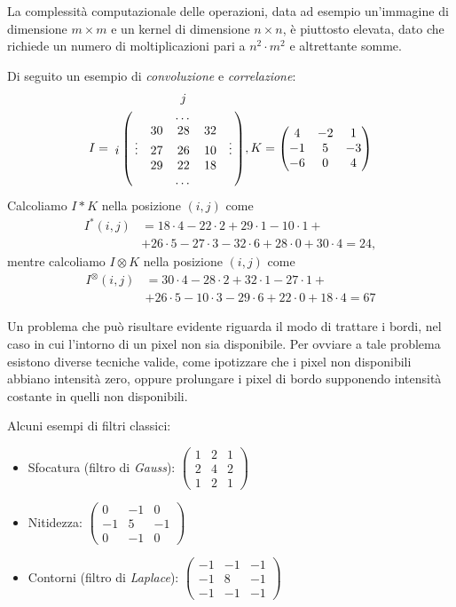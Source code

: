 La complessit\`a computazionale delle operazioni, data ad esempio un'immagine di dimensione $m\times m$ e un kernel di dimensione $n\times n$, \`e piuttosto elevata, dato che richiede un numero di moltiplicazioni pari a $n^{2}\cdot m^{2}$ e altrettante somme.\par
Di seguito un esempio di \textit{convoluzione} e \textit{correlazione}:
$$
I=\bordermatrix{
		& & & j & & \cr
        & & & \dots & & \cr
		& & 30 & 28 & 32 & \cr
		i & \vdots & 27 & 26 & 10 & \vdots \cr
		& & 29 & 22 & 18 & \cr
		& & & \dots & & \cr
	},
K=\begin{pmatrix} 
	4 & -2 & 1 \\
	-1 & 5 & -3\\
	-6 & 0 & 4
\end{pmatrix}
$$
Calcoliamo $I * K$ nella posizione $(i, j)$ come 
\begin{equation}
	\label{eq:convolution-example}
	\begin{split}
		I^{*}(i, j) & = 18\cdot 4 - 22\cdot 2 + 29\cdot 1 - 10\cdot 1+\\ 
		& + 26\cdot 5 -27\cdot 3 - 32\cdot 6 + 28\cdot 0 + 30\cdot 4 = 24,
	\end{split}
\end{equation}
mentre calcoliamo $I \otimes K$ nella posizione $(i, j)$ come 
\begin{equation}
	\label{eq:correlation-example}
	\begin{split}
		I^{\otimes}(i, j) & = 30\cdot 4 - 28\cdot 2 + 32\cdot 1 - 27\cdot 1+\\
		& + 26\cdot 5 -10\cdot 3 - 29\cdot 6 + 22\cdot 0 + 18\cdot 4 = 67
	\end{split}
\end{equation}\par
Un problema che pu\`o risultare evidente riguarda il modo di trattare i bordi, nel caso in cui l'intorno di un pixel non sia disponibile. Per ovviare a tale problema esistono diverse tecniche valide, come ipotizzare che i pixel non disponibili abbiano intensit\`a zero, oppure prolungare i pixel di bordo supponendo intensit\`a costante in quelli non disponibili.\par
Alcuni esempi di filtri classici:
\begin{itemize}
	\item Sfocatura (filtro di \textit{Gauss}): $\begin{pmatrix} 
		1 & 2 & 1 \\
		2 & 4 & 2\\
		1 & 2 & 1
	\end{pmatrix}$
	\item Nitidezza: $\begin{pmatrix} 
		0 & -1 & 0 \\
		-1 & 5 & -1\\
		0 & -1 & 0
	\end{pmatrix}$
	\item Contorni (filtro di \textit{Laplace}): $\begin{pmatrix} 
		-1 & -1 & -1 \\
		-1 & 8 & -1\\
		-1 & -1 & -1
	\end{pmatrix}$
\end{itemize}\par
